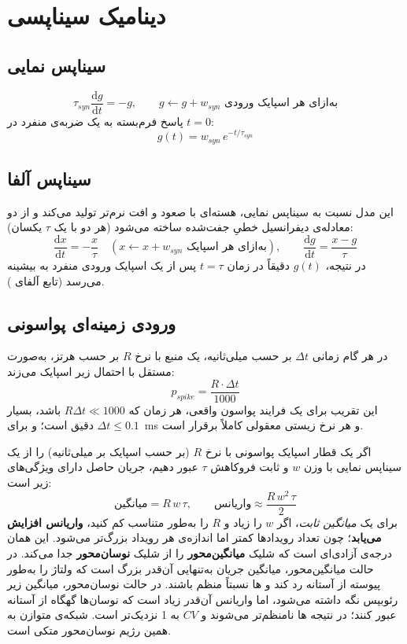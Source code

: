 \documentclass[11pt,a4paper]{article}
\newcommand{\dd}{\mathrm{d}}
\begin{document}
\section{دینامیک سیناپسی}
\subsection{سیناپس نمایی}
\begin{eqbox}
	$$\tau_{syn}\frac{\dd g}{\dd t} = -g, \qquad g \leftarrow g + w_{syn} \text{ به‌ازای هر اسپایک ورودی}$$
	پاسخ فرم‌بسته به یک ضربه‌ی منفرد در $t=0$:
	$$g(t) = w_{syn}\,e^{-t/\tau_{syn}}$$
\end{eqbox}

\subsection{سیناپس آلفا}
این مدل نسبت به سیناپس نمایی، هسته‌ای با صعود و افت نرم‌تر تولید می‌کند و از دو معادله‌ی دیفرانسیل خطیِ جفت‌شده ساخته می‌شود
(هر دو با یک $\tau$ یکسان):
$$\frac{\dd x}{\dd t} = -\frac{x}{\tau} \quad (x \leftarrow x + w_{syn}\text{ به‌ازای هر اسپایک}), \qquad \frac{\dd g}{\dd t} = \frac{x - g}{\tau}$$
در نتیجه، $g(t)$ دقیقاً در زمان $t=\tau$ پس از یک اسپایک ورودی منفرد به بیشینه می‌رسد
(تابع آلفای ).

\subsection{ورودی زمینه‌ای پواسونی}
\begin{defbox}
	در هر گام زمانی $\Delta t$ بر حسب میلی‌ثانیه، یک منبع با نرخ $R$ بر حسب هرتز، به‌صورت مستقل با احتمال زیر اسپایک می‌زند:
	$$p_{spike} = \frac{R\cdot\Delta t}{1000}$$
	این تقریب برای یک فرایند پواسون واقعی، هر زمان که
	$R\Delta t \ll 1000$
	باشد، بسیار دقیق است؛ و برای
	$\Delta t \le 0.1$~ms
	و هر نرخ زیستی معقولی کاملاً برقرار است.
\end{defbox}

\begin{keybox}
	اگر یک قطار اسپایک پواسونی با نرخ $R$ (بر حسب اسپایک بر میلی‌ثانیه) را از یک سیناپس نمایی با وزن $w$ و ثابت فروکاهش $\tau$ عبور دهیم، جریان حاصل دارای ویژگی‌های زیر است:
	$$\text{میانگین} = R\,w\,\tau, \qquad \text{واریانس} \approx \frac{R\,w^2\,\tau}{2}$$
	برای یک \emph{میانگین ثابت}، اگر $w$ را زیاد و $R$ را به‌طور متناسب کم کنید، \textbf{واریانس افزایش می‌یابد}؛ چون تعداد رویدادها کمتر اما اندازه‌ی هر رویداد بزرگ‌تر می‌شود. این همان درجه‌ی آزادی‌ای است که شلیک \textbf{میانگین‌محور} را از شلیک \textbf{نوسان‌محور} جدا می‌کند. در حالت میانگین‌محور، میانگین جریان به‌تنهایی آن‌قدر بزرگ است که ولتاژ را به‌طور پیوسته از آستانه رد کند و ها نسبتاً منظم باشند. در حالت نوسان‌محور، میانگین زیر رئوبیس نگه داشته می‌شود، اما واریانس آن‌قدر زیاد است که نوسان‌ها گهگاه از آستانه عبور کنند؛ در نتیجه ها نامنظم‌تر می‌شوند و $CV$ به 1 نزدیک‌تر است. شبکه‌ی متوازن به همین رژیم نوسان‌محور متکی است.
\end{keybox}
\end{document}

